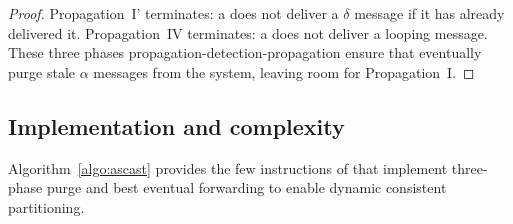 \begin{proof}
  Propagation~I' terminates: a \process does not deliver a $\delta$
  message if it has already delivered it. Propagation~IV terminates: a
  \process does not deliver a looping message.
  These three phases propagation-detection-propagation ensure that
  \processes eventually purge stale $\alpha$ messages from the system,
  leaving room for Propagation~I.
\end{proof}






\subsection{Implementation and complexity}

Algorithm~\ref{algo:ascast} provides the few instructions of \NAME
that implement three-phase purge and best eventual forwarding to
enable dynamic consistent partitioning.



